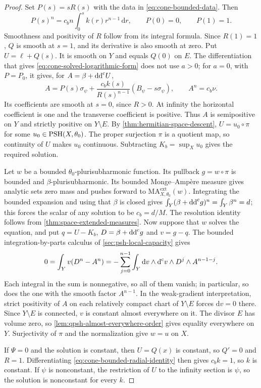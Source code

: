 \begin{proof}
Set $P(s)=sR(s)$ with the data in \eqref{eq:cone-bounded-data}. Then
\begin{equation}\label{eq:cone-bounded-radial-identity}
P(s)^n=c_bn\int_0^s k(r)r^{n-1}\,\mathrm{d} r,\qquad P(0)=0,\qquad P(1)=1.
\end{equation}
Smoothness and positivity of $R$ follow from its integral formula. Since $R(1)=1$, $Q$ is smooth at $s=1$, and its derivative is also smooth at zero. Put $U=\ell+Q(s)$. It is smooth on $Y$ and equals $Q(0)$ on $E$. The differentiation that gives \eqref{eq:cone-solved-logarithmic-form} does not use $a>0$; for $a=0$, with $P=P_0$, it gives, for $A=\beta+\mathrm{dd}^{\mathrm{c}} U$,
\begin{equation}\label{eq:cone-solved-bounded-form}
A=P(s)\sigma_\psi+\frac{c_b k(s)}{R(s)^{n-1}}(B_\psi-s\sigma_\psi),\qquad A^n=c_b\nu.
\end{equation}
Its coefficients are smooth at $s=0$, since $R>0$. At infinity the horizontal coefficient is one and the transverse coefficient is positive. Thus $A$ is semipositive on $Y$ and strictly positive on $Y\setminus E$. By \cref{thm:hermitian-space-descent}, $U=u_0\circ\pi$ for some $u_0\in\mathrm{PSH}(X,\theta_0)$. The proper surjection $\pi$ is a quotient map, so continuity of $U$ makes $u_0$ continuous. Subtracting $K_b=\sup_Xu_0$ gives the required solution.

Let $w$ be a bounded $\theta_0$-plurisubharmonic function. Its pullback $g=w\circ\pi$ is bounded and $\beta$-plurisubharmonic. Its bounded Monge--Amp\`ere measure gives analytic sets zero mass and pushes forward to $\mathrm{MA}^{\mathrm{ext}}_{X,\theta_0}(w)$. Integrating the bounded expansion and using that $\beta$ is closed gives $\int_Y(\beta+\mathrm{dd}^{\mathrm{c}} g)^n=\int_Y\beta^n=d$; this forces the scalar of any solution to be $c_b=d/M$. The resolution identity follows from \cref{thm:space-extended-measures}. Now suppose that $w$ solves the equation, and put $q=U-K_b$, $D=\beta+\mathrm{dd}^{\mathrm{c}} g$ and $v=g-q$. The bounded integration-by-parts calculus of \cref{sec:psh-local-capacity} gives
\[
0=\int_Yv(D^n-A^n)=-\sum_{j=0}^{n-1}\int_Y\mathrm{d}v\wedge\mathrm d^{\mathrm c} v\wedge D^j\wedge A^{n-1-j}.
\]
Each integral in the sum is nonnegative, so all of them vanish; in particular, so does the one with the smooth factor $A^{n-1}$. In the weak-gradient interpretation, strict positivity of $A$ on each relatively compact chart of $Y\setminus E$ forces $\mathrm{d} v=0$ there. Since $Y\setminus E$ is connected, $v$ is constant almost everywhere on it. The divisor $E$ has volume zero, so \cref{lem:qpsh-almost-everywhere-order} gives equality everywhere on $Y$. Surjectivity of $\pi$ and the normalization give $w=u$ on $X$.

If $\Psi=0$ and the solution is constant, then $U=Q(x)$ is constant, so $Q'=0$ and $R=1$. Differentiating \eqref{eq:cone-bounded-radial-identity} then gives $c_bk=1$, so $k$ is constant. If $\psi$ is nonconstant, the restriction of $U$ to the infinity section is $\psi$, so the solution is nonconstant for every $k$.
\end{proof}

